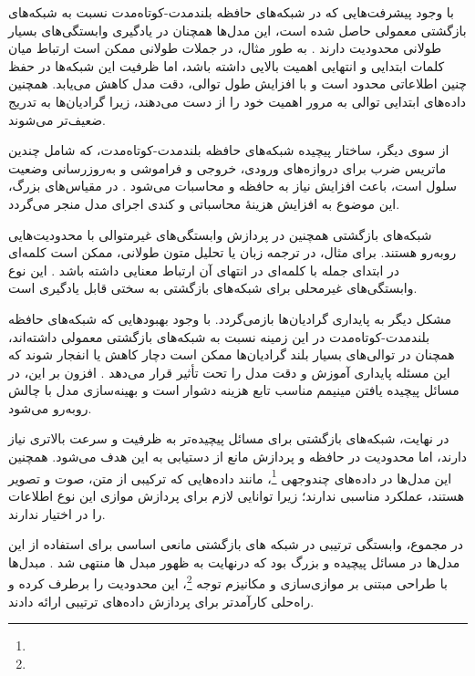 با وجود پیشرفت‌هایی که در شبکه‌های حافظه بلندمدت-کوتاه‌مدت نسبت به شبکه‌های بازگشتی معمولی حاصل شده است، این مدل‌ها همچنان در یادگیری وابستگی‌های بسیار طولانی محدودیت دارند \cite{hochreiter1998vanishing}. به طور مثال، در جملات طولانی ممکن است ارتباط میان کلمات ابتدایی و انتهایی اهمیت بالایی داشته باشد، اما ظرفیت این شبکه‌ها در حفظ چنین اطلاعاتی محدود است و با افزایش طول توالی، دقت مدل کاهش می‌یابد. همچنین داده‌های ابتدایی توالی به مرور اهمیت خود را از دست می‌دهند، زیرا گرادیان‌ها به تدریج ضعیف‌تر می‌شوند.  

از سوی دیگر، ساختار پیچیده شبکه‌های حافظه بلندمدت-کوتاه‌مدت، که شامل چندین ماتریس ضرب برای دروازه‌های ورودی، خروجی و فراموشی و به‌روزرسانی وضعیت سلول است، باعث افزایش نیاز به حافظه و محاسبات می‌شود \cite{goodfellow2016deep}. در مقیاس‌های بزرگ، این موضوع به افزایش هزینهٔ محاسباتی و کندی اجرای مدل منجر می‌گردد.  

شبکه‌های بازگشتی همچنین در پردازش وابستگی‌های غیرمتوالی با محدودیت‌هایی روبه‌رو هستند. برای مثال، در ترجمه زبان یا تحلیل متون طولانی، ممکن است کلمه‌ای در ابتدای جمله با کلمه‌ای در انتهای آن ارتباط معنایی داشته باشد \cite{bahdanau2014neural}. این نوع وابستگی‌های غیرمحلی برای شبکه‌های بازگشتی به سختی قابل یادگیری است.  

مشکل دیگر به پایداری گرادیان‌ها بازمی‌گردد. با وجود بهبودهایی که شبکه‌های حافظه بلندمدت-کوتاه‌مدت در این زمینه نسبت به شبکه‌های بازگشتی معمولی داشته‌اند، همچنان در توالی‌های بسیار بلند گرادیان‌ها ممکن است دچار کاهش یا انفجار شوند که این مسئله پایداری آموزش و دقت مدل را تحت تأثیر قرار می‌دهد \cite{hochreiter1998vanishing}. افزون بر این، در مسائل پیچیده یافتن مینیمم مناسب تابع هزینه دشوار است و بهینه‌سازی مدل با چالش روبه‌رو می‌شود.  

در نهایت، شبکه‌های بازگشتی برای مسائل پیچیده‌تر به ظرفیت و سرعت بالاتری نیاز دارند، اما محدودیت در حافظه و پردازش مانع از دستیابی به این هدف می‌شود. همچنین این مدل‌ها در داده‌های چندوجهی \footnote{}، مانند داده‌هایی که ترکیبی از متن، صوت و تصویر هستند، عملکرد مناسبی ندارند؛ زیرا توانایی لازم برای پردازش موازی این نوع اطلاعات را در اختیار ندارند.

در مجموع، وابستگی ترتیبی در شبکه های بازگشتی مانعی اساسی برای استفاده از این مدل‌ها در مسائل پیچیده و بزرگ بود که درنهایت به ظهور مبدل ها منتهی شد
\cite{vaswani2017attention}.
مبدل‌ها با طراحی مبتنی بر موازی‌سازی و مکانیزم توجه \footnote{}، این محدودیت را برطرف کرده و راه‌حلی کارآمدتر برای پردازش داده‌های ترتیبی ارائه دادند.




